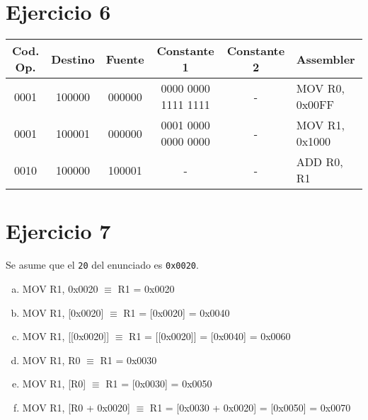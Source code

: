 \section{Ejercicio 6}

\begin{table}[ht]
\ttfamily\small
\begin{tabular}{|c|c|c|c|c|l|}
    Cod. Op. & Destino & Fuente & Constante 1 & Constante 2 & Assembler \\
    \hline
    0001 & 100000 & 000000 & 0000 0000 1111 1111 & - & MOV R0, 0x00FF \\
    0001 & 100001 & 000000 & 0001 0000 0000 0000 & - & MOV R1, 0x1000 \\
    0010 & 100000 & 100001 & - & - & ADD R0, R1 \\
\end{tabular}
\end{table}

\section{Ejercicio 7}

Se asume que el \lstinline{20} del enunciado es \lstinline{0x0020}.

\begin{enumerate}[a)]
    \ttfamily\small
    \item MOV R1, 0x0020 $\equiv$ R1 = 0x0020
    \item MOV R1, [0x0020] $\equiv$ R1 = [0x0020] = 0x0040
    \item MOV R1, [[0x0020]] $\equiv$ R1 = [[0x0020]] = [0x0040] = 0x0060
    \item MOV R1, R0 $\equiv$ R1 = 0x0030
    \item MOV R1, [R0] $\equiv$ R1 = [0x0030] = 0x0050
    \item MOV R1, [R0 + 0x0020] $\equiv$ R1 = [0x0030 + 0x0020] = [0x0050] = 0x0070
\end{enumerate}


